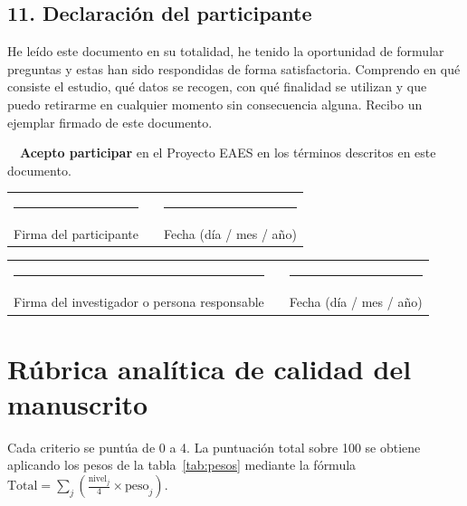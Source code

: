 \documentclass[12pt,a4paper,openany]{report}
\begin{document}
    \section*{11. Declaraci\'on del participante}
    
    He le\'ido este documento en su totalidad, he tenido la oportunidad de formular preguntas y estas han sido respondidas de forma satisfactoria. Comprendo en qu\'e consiste el estudio, qu\'e datos se recogen, con qu\'e finalidad se utilizan y que puedo retirarme en cualquier momento sin consecuencia alguna. Recibo un ejemplar firmado de este documento.
    
    \vspace{4pt}
    \fbox{\phantom{x}}\ \ \textbf{Acepto participar} en el Proyecto EAES en los t\'erminos descritos en este documento.
    
    \vspace{20pt}
    \begin{tabular}{@{}L{6.6cm}@{}L{0.6cm}@{}L{6.6cm}@{}}
        \rule{6.2cm}{0.4pt} & & \rule{6.2cm}{0.4pt} \\
        {\small Firma del participante} & & {\small Fecha (d\'ia / mes / a\~no)} \\
    \end{tabular}
    
    \vspace{16pt}
    \begin{tabular}{@{}L{6.6cm}@{}L{0.6cm}@{}L{6.6cm}@{}}
        \rule{6.2cm}{0.4pt} & & \rule{6.2cm}{0.4pt} \\
        {\small Firma del investigador o persona responsable} & & {\small Fecha (d\'ia / mes / a\~no)} \\
    \end{tabular}
    
    \chapter{R\'ubrica anal\'itica de calidad del manuscrito}
    \label{anx:rubrica}
    
    Cada criterio se punt\'ua de 0 a 4. La puntuaci\'on total sobre 100 se obtiene aplicando los pesos de la tabla~\ref{tab:pesos} mediante la f\'ormula $\text{Total} = \sum_{j} \left( \frac{\text{nivel}_j}{4} \times \text{peso}_j \right)$.
    
\end{document}
